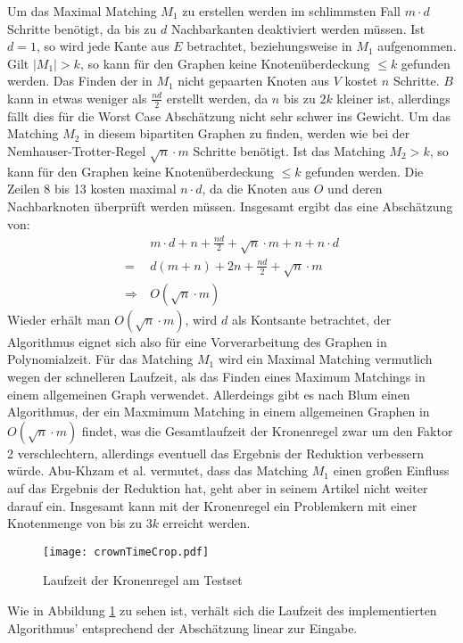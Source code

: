 Um das Maximal Matching $M_{1}$ zu erstellen werden im schlimmsten Fall $m \cdot d$ Schritte benötigt, da bis zu $d$ Nachbarkanten deaktiviert werden müssen. Ist $d = 1$, so wird jede Kante aus $E$ betrachtet, beziehungsweise in $M_{1}$ aufgenommen. Gilt $|M_{1}| > k$, so kann für den Graphen keine Knotenüberdeckung  $ \leq k$ gefunden werden. Das Finden der in $M_{1}$ nicht gepaarten Knoten aus $V$ kostet $n$ Schritte. $B$ kann in etwas weniger als $\frac{nd}{2}$ erstellt werden, da $n$ bis zu $2k$ kleiner ist, allerdings fällt dies für die Worst Case Abschätzung nicht sehr schwer ins Gewicht. Um das Matching $M_{2}$ in diesem bipartiten Graphen zu finden, werden wie bei der Nemhauser-Trotter-Regel  $\sqrt{n} \cdot m$ Schritte benötigt. Ist das Matching $M_{2} > k$, so kann für den Graphen keine Knotenüberdeckung  $ \leq k$ gefunden werden. Die Zeilen 8 bis 13 kosten maximal $n \cdot d$, da die Knoten aus $O$ und deren Nachbarknoten überprüft werden müssen. Insgesamt ergibt das eine Abschätzung von:
\begin{align}
&\ m \cdot d + n + \frac{nd}{2} + \sqrt{n} \cdot m + n  + n \cdot d \\
=&\ d (m+n) +2 n + \frac{nd}{2} + \sqrt{n} \cdot m \\
\Rightarrow &\ O(\sqrt{n} \cdot m)
\end{align}
Wieder erhält man $O(\sqrt{n} \cdot m)$, wird $d$ als Kontsante betrachtet, der Algorithmus eignet sich also für eine Vorverarbeitung des Graphen in Polynomialzeit. Für das Matching $M_{1}$ wird ein Maximal Matching vermutlich wegen der schnelleren Laufzeit, als das Finden eines Maximum Matchings in einem allgemeinen Graph verwendet. Allerdeings gibt es nach Blum \cite{paper:8} einen Algorithmus, der ein Maxmimum Matching in einem allgemeinen Graphen in $O(\sqrt{n} \cdot m)$ findet, was die Gesamtlaufzeit der Kronenregel zwar um den Faktor 2 verschlechtern, allerdings eventuell das Ergebnis der Reduktion verbessern würde. Abu-Khzam et al. \cite{paper:7} vermutet, dass das Matching $M_{1}$ einen großen Einfluss auf das Ergebnis der Reduktion hat, geht aber in seinem Artikel nicht weiter darauf ein. Insgesamt kann mit der Kronenregel ein Problemkern mit einer Knotenmenge von bis zu $3k$ erreicht werden.
\begin{figure}[htb]
\centering
  	{\texttt{[image: crownTimeCrop.pdf]}}
	\caption{Laufzeit der Kronenregel am Testset\label{fig:crownTime}}
\centering
\end{figure}
Wie in Abbildung \ref{fig:crownTime} zu sehen ist, verhält sich die Laufzeit des implementierten Algorithmus' entsprechend der Abschätzung linear zur Eingabe.
